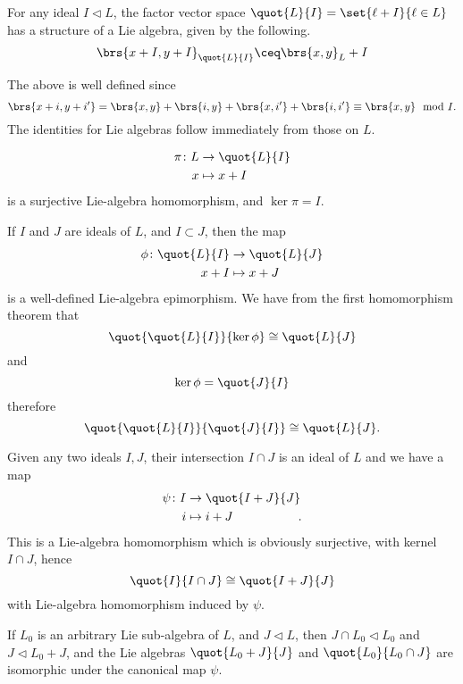 \documentclass[10pt,a4paper,twoside,openany,hidelinks]{book}
\begin{document}
\begin{definition}
For any ideal $I \triangleleft L$, the factor vector space $\quot{L}{I} = \set{\ell + I}{\ell \in L}$ has a structure of a Lie algebra, given by the following.
\begin{align*}
\brs{x+I, y+I}_{\quot{L}{I}} \ceq \brs{x,y}_L + I
\end{align*}
\end{definition}
\begin{remark}
The above is well defined since
\[\brs{x+i, y+i'} = \brs{x,y} + \brs{i,y} + \brs{x,i'} + \brs{i,i'} \equiv \brs{x,y} \mod{I}\text{.}\]
The identities for Lie algebras follow immediately from those on $L$. 
\end{remark}
\begin{theorem}
\begin{align*}
\pi \colon L &\to \quot{L}{I} \\
x &\mapsto x+I
\end{align*}
is a surjective Lie-algebra homomorphism, and $\ker \pi = I$.
\end{theorem}
\begin{theorem}
If $I$ and $J$ are ideals of $L$, and $I \subset J$, then the map
\begin{align*}
\phi \colon \quot{L}{I} &\to \quot{L}{J} \\
x+I &\mapsto x+J 
\end{align*}
is a well-defined Lie-algebra epimorphism.
We have from the first homomorphism theorem that
\[\quot{\quot{L}{I}}{\ker \phi} \cong \quot{L}{J}\]
and
\[\ker \phi = \quot{J}{I}\]
therefore
\[\quot{\quot{L}{I}}{\quot{J}{I}} \cong \quot{L}{J}\text{.}\]
\end{theorem}
\begin{theorem}
Given any two ideals $I,J$, their intersection $I \cap J$ is an ideal of $L$ and we have a map
\begin{align*}
\psi \colon I &\to \quot{I+J}{J} \\
i &\mapsto i+J \phantom{\quot{}{J}}\text{.}
\end{align*}
This is a Lie-algebra homomorphism which is obviously surjective, with kernel $I \cap J$, hence
\[\quot{I}{I \cap J} \cong \quot{I+J}{J}\]
with Lie-algebra homomorphism induced by $\psi$.
\end{theorem}
\begin{remark}
If $L_0$ is an arbitrary Lie sub-algebra of $L$, and $J \triangleleft L$, then
$J \cap L_0 \triangleleft L_0$ and $J \triangleleft L_0 + J$, and the Lie algebras $\quot{L_0 + J}{J}$ and $\quot{L_0}{L_0 \cap J}$ are isomorphic under the canonical map $\psi$.
\end{remark}
\end{document}
